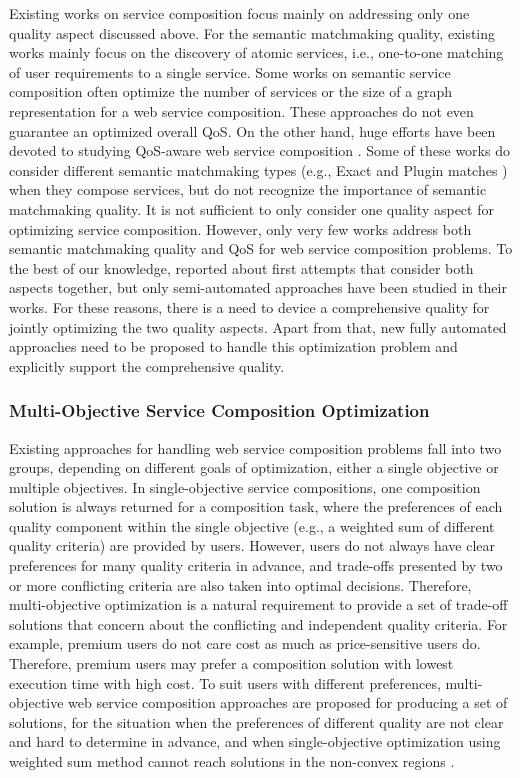 Existing works on service composition focus mainly on addressing only one quality aspect discussed above. For the semantic matchmaking quality, existing works mainly focus on the discovery of atomic services, i.e., one-to-one matching of user requirements to a single service. Some works \cite{bansal2016generalized,boustil2014semantic,mier2015integrated} on semantic service composition often optimize the number of services or the size of a graph representation for a web service composition. These approaches do not even guarantee an optimized overall QoS. On the other hand, huge efforts have been devoted to studying QoS-aware web service composition \cite{da2015graphevol,da2016particle,gupta2015optimization,ma2015hybrid,qi2010combining,yu2013adaptive}. Some of these works do consider different semantic matchmaking types (e.g., Exact and Plugin matches \cite{paolucci2002semantic}) when they compose services, but do not recognize the importance of semantic matchmaking quality. It is not sufficient to only consider one quality aspect for optimizing service composition. However, only very few works address both semantic matchmaking quality and QoS for web service composition problems. To the best of our knowledge, \cite{fanjiang2014semantic,lecue2009optimizing,pop2009immune} reported about first attempts that consider both aspects together, but only semi-automated approaches have been studied in their works. For these reasons, there is a need to device a comprehensive quality for jointly optimizing the two quality aspects. Apart from that, new fully automated approaches need to be proposed to handle this optimization problem and explicitly support the comprehensive quality. 


\subsubsection{Multi-Objective Service Composition Optimization}
Existing approaches for handling web service composition problems fall into two groups, depending on different goals of optimization, either a single objective or multiple objectives. In single-objective service compositions, one composition solution is always returned for a composition task, where the preferences of each quality component within the single objective (e.g., a weighted sum of different quality criteria) are provided by users. However, users do not always have clear preferences for many quality criteria in advance, and trade-offs presented by two or more conflicting criteria are also taken into optimal decisions. Therefore, multi-objective optimization is a natural requirement to provide a set of trade-off solutions that concern about the conflicting and independent quality criteria. For example, premium users do not care cost as much as price-sensitive users do. Therefore, premium users may prefer a composition solution with lowest execution time with high cost. To suit users with different preferences, multi-objective web service composition approaches are proposed for producing a set of solutions, for the situation when the preferences of different quality are not clear and hard to determine in advance, and when single-objective optimization using weighted sum method cannot reach solutions in the non-convex regions \cite{kim2006adaptive}.  

